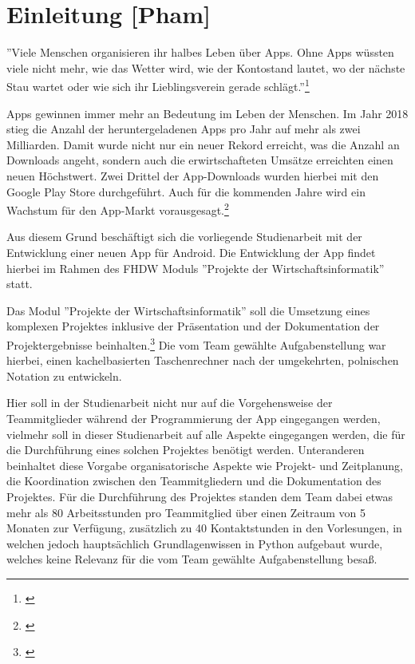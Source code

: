 
\section{Einleitung [Pham]}

''Viele Menschen organisieren ihr halbes Leben über Apps. Ohne Apps wüssten viele nicht mehr, wie das Wetter wird, wie der Kontostand lautet, wo der nächste Stau wartet oder wie sich ihr Lieblingsverein gerade schlägt.''\footnote{\cite[Berg, zitiert nach][]{rondinella2019}}

Apps gewinnen immer mehr an Bedeutung im Leben der Menschen. Im Jahr 2018 stieg die Anzahl der heruntergeladenen Apps pro Jahr auf mehr als zwei Milliarden. Damit wurde nicht nur ein neuer Rekord erreicht, was die Anzahl an Downloads angeht, sondern auch die erwirtschafteten Umsätze erreichten einen neuen Höchstwert. Zwei Drittel der App-Downloads wurden hierbei mit den Google Play Store durchgeführt. Auch für die kommenden Jahre wird ein Wachstum für den App-Markt vorausgesagt.\footnote{\cite[vgl.][]{rondinella2019}}

Aus diesem Grund beschäftigt sich die vorliegende Studienarbeit mit der Entwicklung einer neuen App für Android. Die Entwicklung der App findet hierbei im Rahmen des FHDW Moduls ''Projekte der Wirtschaftsinformatik'' statt.

Das Modul ''Projekte der Wirtschaftsinformatik'' soll die Umsetzung eines komplexen Projektes inklusive der Präsentation und der Dokumentation der Projektergebnisse beinhalten.\footnote{\cite[vgl.][]{fhdw2020}}  Die vom Team gewählte Aufgabenstellung war hierbei, einen kachelbasierten Taschenrechner nach der umgekehrten, polnischen Notation zu entwickeln. 

Hier soll in der Studienarbeit nicht nur auf die Vorgehensweise der Teammitglieder während der Programmierung der App eingegangen werden, vielmehr soll in dieser Studienarbeit auf alle Aspekte eingegangen werden, die für die Durchführung eines solchen Projektes benötigt werden. Unteranderen beinhaltet diese Vorgabe organisatorische Aspekte wie Projekt- und Zeitplanung, die Koordination zwischen den Teammitgliedern und die Dokumentation des Projektes. Für die Durchführung des Projektes standen dem Team dabei etwas mehr als 80 Arbeitsstunden pro Teammitglied über einen Zeitraum von 5 Monaten zur Verfügung, zusätzlich zu 40 Kontaktstunden in den Vorlesungen, in welchen jedoch hauptsächlich Grundlagenwissen in Python aufgebaut wurde, welches keine Relevanz für die vom Team gewählte Aufgabenstellung besaß. 